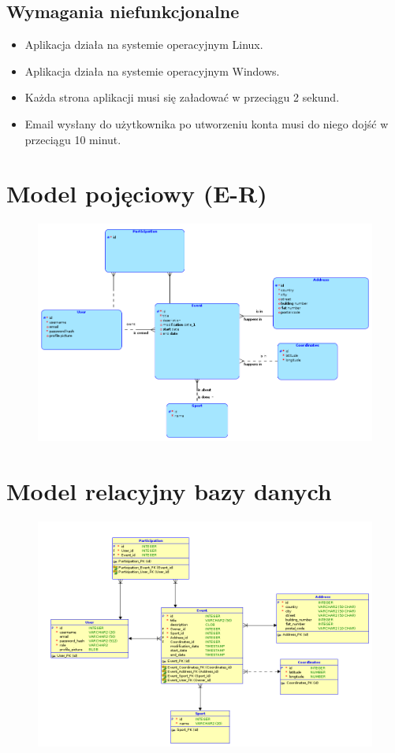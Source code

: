 \documentclass[11pt,a4paper]{article}
\begin{document}
\subsection{Wymagania niefunkcjonalne}

\begin{itemize}
    \item Aplikacja działa na systemie operacyjnym Linux.
    \item Aplikacja działa na systemie operacyjnym Windows.
    \item Każda strona aplikacji musi się załadować w przeciągu 2 sekund.
    \item Email wysłany do użytkownika po utworzeniu konta musi do niego dojść w przeciągu 10 minut.
\end{itemize}

\section{Model pojęciowy (E-R)}

\begin{figure} [H]
    \centering
    \includegraphics[width=0.95\linewidth]{model/model_er.png}
\end{figure}

\section{Model relacyjny bazy danych}

\begin{figure} [H]
    \centering
    \includegraphics[width=0.95\linewidth]{model/model_rel.png}
\end{figure}
\end{document}
